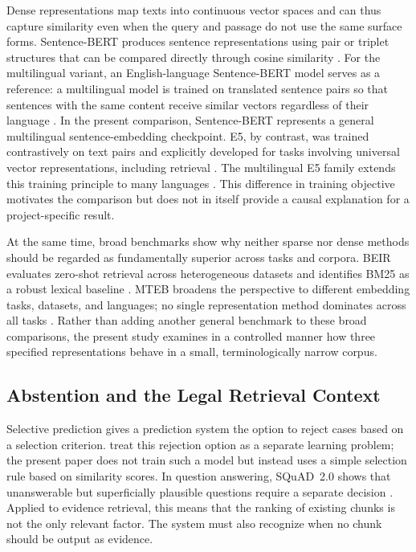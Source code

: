 \documentclass[11pt]{article}
\begin{document}
Dense representations map texts into continuous vector spaces and can thus capture similarity even when the query and passage do not use the same surface forms. Sentence-BERT produces sentence representations using pair or triplet structures that can be compared directly through cosine similarity \citep{reimers-gurevych-2019-sentence}. For the multilingual variant, an English-language Sentence-BERT model serves as a reference: a multilingual model is trained on translated sentence pairs so that sentences with the same content receive similar vectors regardless of their language \citep{reimers-gurevych-2020-making}. In the present comparison, Sentence-BERT represents a general multilingual sentence-embedding checkpoint. E5, by contrast, was trained contrastively on text pairs and explicitly developed for tasks involving universal vector representations, including retrieval \citep{wang2022text}. The multilingual E5 family extends this training principle to many languages \citep{wang2024multilingual}. This difference in training objective motivates the comparison but does not in itself provide a causal explanation for a project-specific result.

At the same time, broad benchmarks show why neither sparse nor dense methods should be regarded as fundamentally superior across tasks and corpora. BEIR evaluates zero-shot retrieval across heterogeneous datasets and identifies BM25 as a robust lexical baseline \citep{thakur2021beir}. MTEB broadens the perspective to different embedding tasks, datasets, and languages; no single representation method dominates across all tasks \citep{muennighoff-etal-2023-mteb}. Rather than adding another general benchmark to these broad comparisons, the present study examines in a controlled manner how three specified representations behave in a small, terminologically narrow corpus.

\subsection{Abstention and the Legal Retrieval Context}

Selective prediction gives a prediction system the option to reject cases based on a selection criterion. \citet{pmlr-v97-geifman19a} treat this rejection option as a separate learning problem; the present paper does not train such a model but instead uses a simple selection rule based on similarity scores. In question answering, SQuAD~2.0 shows that unanswerable but superficially plausible questions require a separate decision \citep{rajpurkar-etal-2018-know}. Applied to evidence retrieval, this means that the ranking of existing chunks is not the only relevant factor. The system must also recognize when no chunk should be output as evidence.
\end{document}
